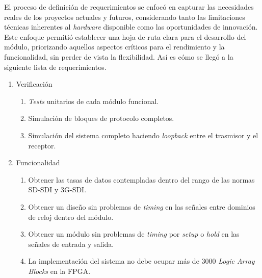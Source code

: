   El proceso de definición de requerimientos se enfocó en capturar las
  necesidades reales de los proyectos actuales y futuros, considerando tanto
  las limitaciones técnicas inherentes al \textit{hardware} disponible como las
  oportunidades de innovación. Este enfoque permitió establecer una hoja de ruta
  clara para el desarrollo del módulo, priorizando aquellos aspectos críticos
  para el rendimiento y la funcionalidad, sin perder de vista la flexibilidad.
  Así es cómo se llegó a la siguiente lista de requerimientos.

  \begin{enumerate}
      \item Verificación
      \begin{enumerate}
          \item \textit{Tests} unitarios de cada módulo funcional.
          \item Simulación de bloques de protocolo completos.
          \item Simulación del sistema completo haciendo \textit{loopback} entre el trasmisor y el receptor.
      \end{enumerate}
      \item Funcionalidad
      \begin{enumerate}
          \item Obtener las tasas de datos contempladas dentro del rango de las normas SD-SDI y 3G-SDI\@.
          \item Obtener un diseño sin problemas de \textit{timing} en las señales entre dominios de reloj
          dentro del módulo.
          \item Obtener un módulo sin problemas de \textit{timing} por \textit{setup} o \textit{hold} en las señales de entrada y salida.
          \item La implementación del sistema no debe ocupar más de 3000 \textit{Logic Array Blocks} en la FPGA\@.
      \end{enumerate}

\end{enumerate}
